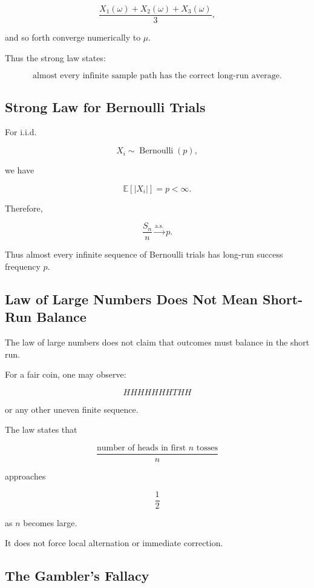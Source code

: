 \[
\frac{X_1(\omega)+X_2(\omega)+X_3(\omega)}3,
\]

and so forth converge numerically to \(\mu\).

Thus the strong law states:

\[
\boxed{
\text{almost every infinite sample path has the correct long-run
average}.
}
\]

\subsection{Strong Law for Bernoulli Trials}
\label{subsec:strong-law-bernoulli}

For i.i.d.

\[
X_i\sim\operatorname{Bernoulli}(p),
\]

we have

\[
\mathbb{E}[|X_i|]=p<\infty.
\]

Therefore,

\[
\boxed{
\frac{S_n}{n}
\xrightarrow{\text{a.s.}}
p.
}
\]

Thus almost every infinite sequence of Bernoulli trials has long-run
success frequency \(p\).

\subsection{Law of Large Numbers Does Not Mean Short-Run Balance}
\label{subsec:lln-not-short-run-balance}

The law of large numbers does not claim that outcomes must balance in
the short run.

For a fair coin, one may observe:

\[
HHHHHHHTHH
\]

or any other uneven finite sequence.

The law states that

\[
\frac{
\text{number of heads in first \(n\) tosses}
}{n}
\]

approaches

\[
\frac12
\]

as \(n\) becomes large.

It does not force local alternation or immediate correction.

\subsection{The Gambler's Fallacy}
\label{subsec:gamblers-fallacy-lln}

